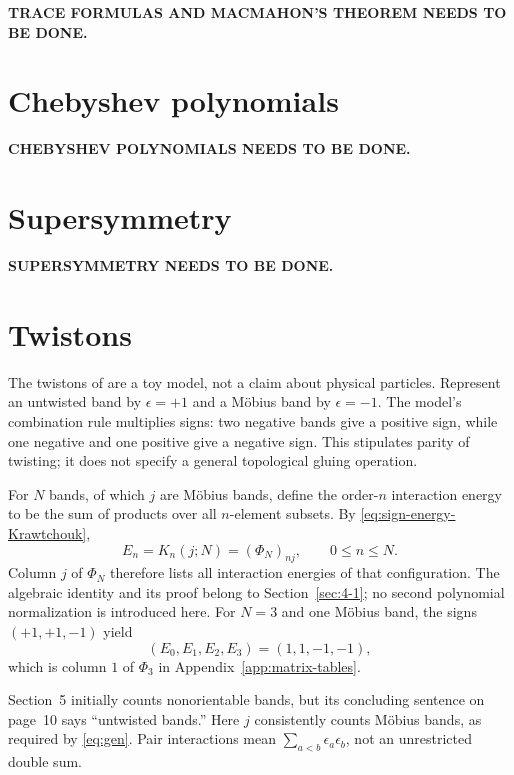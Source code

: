 \noindent\textbf{TRACE FORMULAS AND MACMAHON'S THEOREM NEEDS TO BE DONE.}


\section{Chebyshev polynomials}
\label{sec:9-4}

\noindent\textbf{CHEBYSHEV POLYNOMIALS NEEDS TO BE DONE.}


\section{Supersymmetry}
\label{sec:9-5}

\noindent\textbf{SUPERSYMMETRY NEEDS TO BE DONE.}


\section{Twistons}
\label{sec:9-6}
The twistons of \cite[Section~5, pp.~9--10]{KocikFeynman} are a toy model,
not a claim about physical particles. Represent an untwisted band by
$\epsilon=+1$ and a M\"obius band by $\epsilon=-1$. The model's combination
rule multiplies signs: two negative bands give a positive sign, while one
negative and one positive give a negative sign. This stipulates parity of
twisting; it does not specify a general topological gluing operation.

For $N$ bands, of which $j$ are M\"obius bands, define the order-$n$
interaction energy to be the sum of products over all $n$-element subsets.
By \eqref{eq:sign-energy-Krawtchouk},
\[
E_n=K_n(j;N)=(\Phi_N)_{nj},\qquad 0\leq n\leq N.
\]
Column $j$ of $\Phi_N$ therefore lists all interaction energies of that
configuration. The algebraic identity and its proof belong to
Section~\ref{sec:4-1}; no second polynomial normalization is introduced here.
For $N=3$ and one M\"obius band, the signs $(+1,+1,-1)$ yield
\[
(E_0,E_1,E_2,E_3)=(1,1,-1,-1),
\]
which is column $1$ of $\Phi_3$ in Appendix~\ref{app:matrix-tables}.

\begin{remark}
Section~5 initially counts nonorientable bands, but its concluding
sentence on page~10 says ``untwisted bands.'' Here $j$ consistently counts
M\"obius bands, as required by \eqref{eq:gen}. Pair interactions mean
$\sum_{a<b}\epsilon_a\epsilon_b$, not an unrestricted double sum.
\end{remark}


